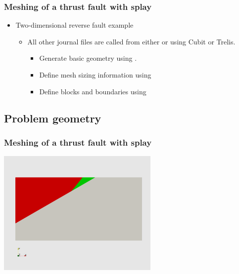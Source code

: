 \documentclass[aspectratio=169]{beamer}
\begin{document}
\begin{frame}
  \frametitle{Meshing of a thrust fault with splay}
  
  \begin{itemize}
  \item Two-dimensional reverse fault example\\
    \begin{itemize}
    \item All other journal files are called from either
       or  using Cubit or Trelis.
      \begin{itemize}
      \item Generate basic geometry using .
      \item Define mesh sizing information using 
      \item Define blocks and boundaries using 
      \end{itemize}
    \end{itemize}
  \end{itemize}


\end{frame}


\subsection{Problem geometry}

\begin{frame}
  \frametitle{Meshing of a thrust fault with splay}
 
  \vfill
  \begin{center}
    \includegraphics[height=6.1cm]{figs/reverse_geometry}
  \end{center}
  \vfill

\end{frame}
\end{document}
